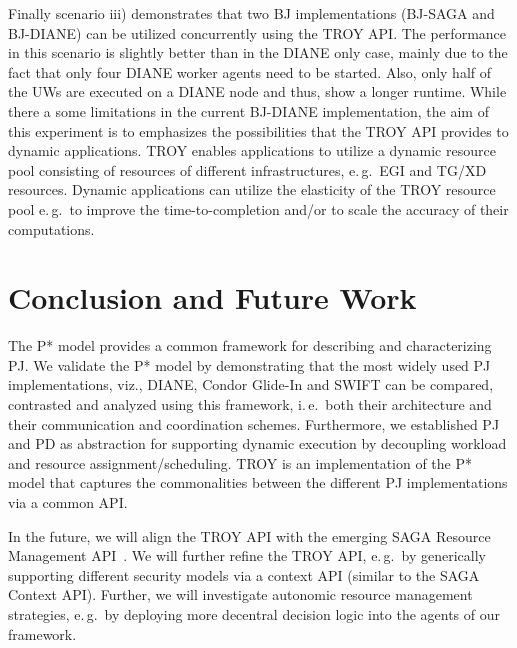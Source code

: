 \documentclass[conference,final]{IEEEtran}
\newcommand{\upp}{\vspace*{-0.5em}}
\begin{document}
Finally scenario iii) demonstrates that two BJ implementations
(BJ-SAGA and BJ-DIANE) can be utilized concurrently using the TROY
API. The performance in this scenario is slightly better than in the
DIANE only case, mainly due to the fact that only four DIANE worker
agents need to be started. Also, only half of the UWs are executed on
a DIANE node and thus, show a longer runtime. While there a some
limitations in the current BJ-DIANE implementation, the aim of this
experiment is to emphasizes the possibilities that the TROY API
provides to dynamic applications. TROY enables applications to utilize
a dynamic resource pool consisting of resources of different
infrastructures, e.\,g.\ EGI and TG/XD resources. Dynamic applications
can utilize the elasticity of the TROY resource pool e.\,g.\ to
improve the time-to-completion and/or to scale the accuracy of their
computations.



\upp


\section{Conclusion and Future Work\upp\upp}

The P* model provides a common framework for describing and
characterizing PJ. We validate the P* model by
demonstrating %
that the most widely used PJ implementations, viz., DIANE, Condor
Glide-In and SWIFT can be compared, contrasted and analyzed using this
framework, i.\,e.\ both their architecture and their communication and
coordination schemes.  Furthermore, we established PJ and PD as
abstraction for supporting dynamic execution by decoupling workload
and resource assignment/scheduling.  TROY is an implementation of the
P* model that captures the commonalities between the different PJ
implementations via a common API.


In the future, we will align the TROY API with the emerging SAGA
Resource Management API~\cite{saga_rm}. We will further refine the
TROY API, e.\,g.\ by generically supporting different security models
via a context API (similar to the SAGA Context API). Further, we will
investigate autonomic resource management strategies, e.\,g.\ by
deploying more decentral decision logic into the agents of our
framework.
\end{document}
